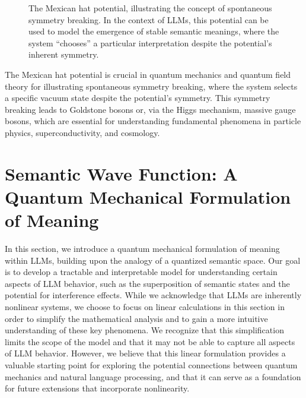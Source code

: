 \documentclass[prd,amsmath,amssymb,12pt]{revtex4}
\DeclarePairedDelimiter\ket{\lvert}{\rangle}
\begin{document}
\begin{figure}[h!]
    \centering
    \caption{The Mexican hat potential, illustrating the concept of spontaneous symmetry breaking. In the context of
    LLMs, this potential can be used to model the emergence of stable semantic meanings, where the system ``chooses''
    a particular interpretation despite the potential's inherent symmetry.}
    \label{fig:mexican-hat}
\end{figure}

The Mexican hat potential is crucial in quantum mechanics and quantum field theory for illustrating spontaneous
symmetry breaking, where the system selects a specific vacuum state despite the potential's symmetry. This symmetry
breaking leads to Goldstone bosons or, via the Higgs mechanism, massive gauge bosons, which are essential for
understanding fundamental phenomena in particle physics, superconductivity, and cosmology.

\section{Semantic Wave Function: A Quantum Mechanical Formulation of Meaning}

In this section, we introduce a quantum mechanical formulation of meaning within LLMs,
building upon the analogy of a quantized semantic space. Our goal is to develop a tractable and
interpretable model for understanding certain aspects of LLM behavior, such as the superposition of
semantic states and the potential for interference effects. While we acknowledge that LLMs are
inherently nonlinear systems, we choose to focus on linear calculations in this section in
order to simplify the mathematical analysis and to gain a more intuitive understanding of
these key phenomena. We recognize that this simplification limits the scope of the model and
that it may not be able to capture all aspects of LLM behavior. However, we believe that this
linear formulation provides a valuable starting point for exploring the potential connections
between quantum mechanics and natural language processing, and that it can serve as a foundation
for future extensions that incorporate nonlinearity.
\end{document}

